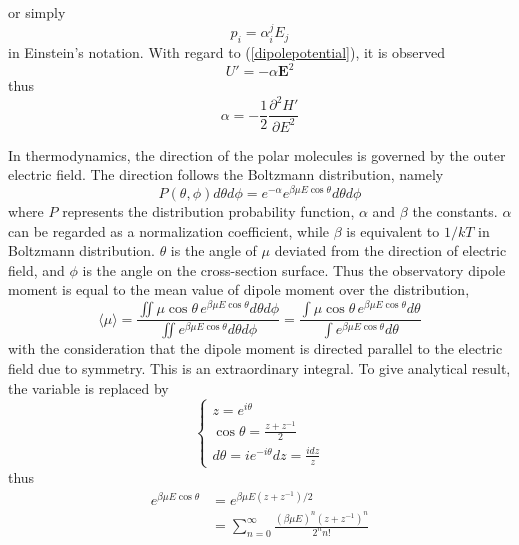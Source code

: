 \documentclass[%
 reprint,
 amsmath,amssymb,
 aps,
10.5pt,
]{revtex4-1}
\begin{document}
  or simply
 \begin{equation}
 	p_i = \alpha^j_i E_j
 \end{equation}
 in Einstein's notation. With regard to (\ref{dipolepotential}), it is observed
 \begin{equation}
 	U' = - \alpha \mathbf{E}^2
 \end{equation}
 thus
 \begin{equation}
 	\alpha = - \frac{1}{2}\frac{\partial^2 H'}{\partial E^2}
 \end{equation}

In thermodynamics, the direction of the polar molecules is governed by the outer electric field. The direction follows the Boltzmann distribution, namely
\begin{equation}
	P(\theta,\phi) d\theta d\phi = e^{-\alpha} e^{\beta \mu E \cos{\theta}} d\theta d\phi
\end{equation}
where $P$ represents the distribution probability function, $\alpha$ and $\beta$ the constants. $\alpha$ can be regarded as a normalization coefficient, while $\beta$ is equivalent to $1/kT$ in Boltzmann distribution. $\theta$ is the angle of $\mu$ deviated from the direction of electric field, and $\phi$ is the angle on the cross-section surface. Thus the observatory dipole moment is equal to the mean value of dipole moment over the distribution, 
\begin{equation}
   \langle  \mu \rangle =
   \frac{\iint \mu \cos{\theta} \, e^{\beta \mu E \cos{\theta}} d\theta d\phi}{\iint e^{\beta \mu E \cos{\theta}} d\theta d\phi} = \frac{\int \mu \cos{\theta} \, e^{\beta \mu E \cos{\theta}} d\theta}{\int e^{\beta \mu E \cos{\theta}} d\theta}
 \end{equation} 
 with the consideration that the dipole moment is directed parallel to the electric field due to symmetry. 
This is an extraordinary integral. To give analytical
result, the variable is replaced by
\begin{equation}
\left\{ \begin{array} { l } { z = e ^ { i \theta } } \\ { \cos \theta = \frac { z + z ^ { - 1 } } { 2 } } \\ { d \theta = i e ^ { - i \theta } d z = \frac { i d z } { z } } \end{array} \right.
\end{equation}
thus
\begin{equation}
\begin{aligned} 
e ^ { \beta \mu E \cos \theta } & = e ^ { \beta \mu E \left( z + z ^ { - 1 } \right) / 2 } \\ 
& = \sum _ { n = 0 } ^ { \infty } \frac { ( \beta \mu E ) ^ { n } \left( z + z ^ { - 1 } \right) ^ { n } } { 2 ^ { n } n ! } 
\end{aligned}
\end{equation}
\end{document}
